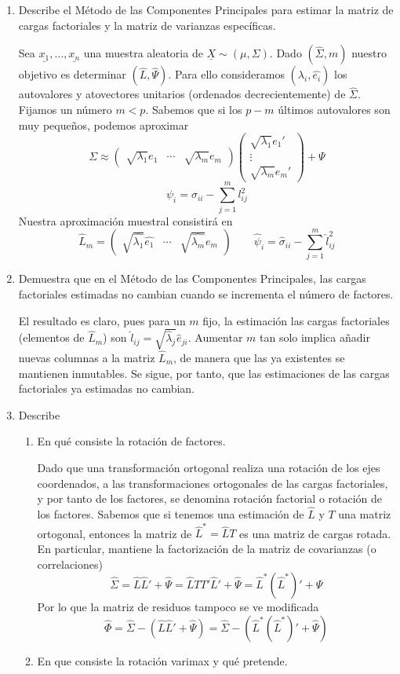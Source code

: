 \documentclass[twoside]{article}
\newcommand{\muestra}[1]{{\underline{#1}}}
\newcommand{\mX}{{\muestra{X}}}
\begin{document}
\begin{enumerate}
\item Describe el Método de las Componentes Principales para estimar la matriz de cargas factoriales y la matriz de varianzas específicas.

Sea $\muestra{x_1},\dotsc,\muestra{x_n}$ una muestra aleatoria de $\mX\sim (\mu,\Sigma)$. Dado $(\hat{\Sigma},m)$ nuestro objetivo es determinar $(\hat{L},\hat{\Psi})$. Para ello consideramos $(\hat{\lambda_i},\hat{e_i})$ los autovalores y atovectores unitarios (ordenados decrecientemente) de $\hat{\Sigma}$. Fijamos un número $m<p$. Sabemos que si los $p-m$ últimos autovalores son muy pequeños, podemos aproximar
$$
\Sigma  \approx \begin{pmatrix}
\sqrt{\lambda_1}e_1 & \cdots & \sqrt{\lambda_m}e_m 
\end{pmatrix}
\begin{pmatrix}
\sqrt{\lambda_1}e_1' \\ \vdots \\ \sqrt{\lambda_m}e_m'
\end{pmatrix} + \Psi
$$
$$
\psi_i = \sigma_{ii}-\sum_{j=1}^m l_{ij}^2
$$
Nuestra aproximación muestral consistirá en $$\hat{L}_m=\begin{pmatrix}
\sqrt{\hat{\lambda_1}}\hat{e_1} & \cdots & \sqrt{\hat{\lambda_m}}\hat{e_m}\end{pmatrix} \qquad 	\hat{\psi}_i = \hat{\sigma}_{ii}-\sum_{j=1}^m \hat{l}_{ij}^2
$$
\item Demuestra que en el Método de las Componentes Principales, las cargas factoriales estimadas no cambian cuando se incrementa el número de factores.

El resultado es claro, pues para un $m$ fijo, la estimación las cargas factoriales (elementos de $\hat{L}_m$) son $\hat{l}_{ij}=\sqrt{\hat{\lambda}_j}\hat{e}_{ji}$. Aumentar $m$ tan solo implica añadir nuevas columnas a la matriz $\hat{L}_m$, de manera que las ya existentes se mantienen inmutables. Se sigue, por tanto, que las estimaciones de las cargas factoriales ya estimadas no cambian.
\item Describe
\begin{enumerate}
	\item En qué consiste la rotación de factores.

	Dado que una transformación ortogonal realiza una rotación de los ejes coordenados, a las transformaciones ortogonales de las cargas factoriales, y por tanto de los factores, se denomina rotación factorial o rotación de los factores. Sabemos que si tenemos una estimación de $\hat{L}$ y $T$ una matriz ortogonal, entonces la matriz de $\hat{L}^* = \hat{L}T$ es una matriz de cargas rotada. En particular, mantiene la factorización de la matriz de covarianzas (o correlaciones)
	$$
	\hat{\Sigma} = \hat{L}\hat{L}' + \hat{\Psi} = \hat{L}TT'\hat{L}' + \hat{\Psi} = \hat{L}^*(\hat{L}^*)'+\Psi
	$$ 
Por lo que la matriz de residuos tampoco se ve modificada
$$
\hat{\Phi} = \hat{\Sigma} -( \hat{L}\hat{L}' + \hat{\Psi}) =  \hat{\Sigma} -(\hat{L}^*(\hat{L}^*)' + \hat{\Psi})
$$
	\item En que consiste la rotación varimax y qué pretende.
	

\end{enumerate}
\end{enumerate}
\end{document}
